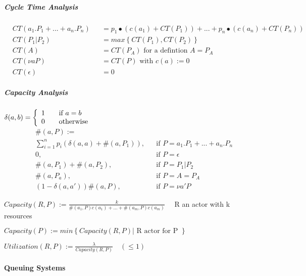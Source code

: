 \documentclass[a4paper,12pt,smallheadings]{scrartcl}
\begin{document}
\subparagraph{Cycle Time Analysis}
\begin{align*}
&CT\left(a_1.P_1+...+a_n.P_n\right)&&= p_1\bullet\left(c\left(a_1\right)+CT\left(P_1\right)\right)+...+p_n\bullet\left(c\left(a_n\right)+CT\left(P_n\right)\right) \\
&CT\left(P_1|P_2\right) &&= max\left\lbrace CT\left(P_1\right), CT\left(P_2\right)\right\rbrace \\
&CT\left(A\right) &&= CT\left(P_A\right) \text{ for a defintion } A = P_A \\
&CT\left(\nu a P\right) &&= CT\left(P\right) \text{ with } c\left(a\right) := 0 \\
&CT\left(\epsilon\right) &&= 0
\end{align*}

\subparagraph{Capacity Analysis} \hfill

\begin{math}
\delta(a,b) = \left\lbrace
	\begin{array}{l l}
		1 & \quad \text{if } a=b \\
		0 & \quad \text{otherwise}
	\end{array} \right.
\end{math}
\begin{align*}
&\#\left(a,P\right) := \\
&\sum_{i=1}^{n} p_i\left(\delta\left(a,a\right)+\#\left(a,P_1\right)\right),& &\text{if } P=a_1.P_1+...+a_n.P_n \\
&0,& &\text{if } P=\epsilon \\
&\#\left(a,P_1\right) + \#\left(a,P_2\right),& &\text{if } P=P_1|P_2 \\
&\#\left(a,P_a\right), & &\text{if } P = A = P_A \\
&\left(1-\delta\left(a,a'\right)\right) \#\left(a,P\right),& &\text{if } P = \nu a' P
\end{align*}

$Capacity\left(R,P\right) := \frac{k}{\#\left(a_1,P\right)c\left(a_1\right) + ... + \#\left(a_m,P\right)c\left(a_m\right)} \quad$ R an actor with k resources

$Capacity\left(P\right):= min\left\lbrace Capacity\left(R,P\right) | \text{ R actor for P }\right\rbrace$

$Utilization \left( R,P\right) := \frac{\lambda}{Capacity \left(R,P\right)} \quad \left( \leq 1\right)$

\paragraph{Queuing Systems}
\end{document}
